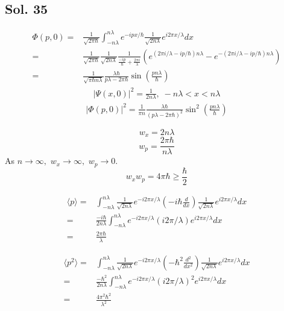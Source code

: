 \subsection*{Sol. 35}
\begin{align*}
    \Phi(p,0)=&
    \frac{1}{\sqrt{2\pi\hbar}}
    \int_{-n\lambda}^{n\lambda}
    e^{-ipx/\hbar}
    \frac{1}{\sqrt{2n\lambda}}
    e^{i2\pi x/\lambda}dx
    \\=&
     \frac{1}{\sqrt{2\pi\hbar}}
     \frac{1}{\sqrt{2n\lambda}}
     \frac{1}{\frac{-ip}{\hbar}+\frac{2\pi i}{\lambda}}
     (e^{(2\pi i/\lambda-ip/\hbar)n\lambda}-e^{-(2\pi i/\lambda-ip/\hbar)n\lambda})\\
     =&\frac{1}{\sqrt{\pi\hbar n\lambda}}\frac{\lambda\hbar}{p\lambda-2\pi \hbar}\sin\left(\frac{pn\lambda}{\hbar}\right)
\end{align*}
\begin{align*}
    |\Psi(x,0)|^2 = \frac{1}{2n\lambda}, \; -n\lambda < x<n\lambda
\end{align*}
\begin{align*}
    |\Phi(p,0)|^2 = 
    \frac{1}{\pi n}\frac{\lambda\hbar}{(p\lambda-2\pi \hbar)^2}
    \sin^2\left(\frac{pn\lambda}{\hbar}\right)
\end{align*}


$$
w_x = 2n\lambda
$$
$$
w_p = \frac{2\pi \hbar}{n\lambda}
$$
As $n\to\infty,$ $w_x\to\infty,$ $w_p\to0.$
$$
w_xw_p = 4\pi\hbar \geq \frac{\hbar}{2}
$$

\begin{align*}
    \langle p\rangle
=&\int_{-n\lambda}^{n\lambda}
\frac{1}{\sqrt{2n\lambda}}e^{-i2\pi x/\lambda}
(-i\hbar\frac{d}{dx})
\frac{1}{\sqrt{2n\lambda}}e^{i2\pi x/\lambda}dx\\
=&\frac{-i\hbar}{2n\lambda}
\int_{-n\lambda}^{n\lambda}
e^{-i2\pi x/\lambda}(i2\pi/\lambda)e^{i2\pi x/\lambda}dx\\
=&\frac{2\pi\hbar}{\lambda}
\end{align*}

\begin{align*}
    \langle p^2\rangle
=&\int_{-n\lambda}^{n\lambda}
\frac{1}{\sqrt{2n\lambda}}e^{-i2\pi x/\lambda}
(-\hbar^2\frac{d^2}{dx^2})
\frac{1}{\sqrt{2n\lambda}}e^{i2\pi x/\lambda}dx\\
=&\frac{-\hbar^2}{2n\lambda}
\int_{-n\lambda}^{n\lambda}
e^{-i2\pi x/\lambda}(i2\pi/\lambda)^2e^{i2\pi x/\lambda}dx\\
=&\frac{4\pi^2\hbar^2}{\lambda^2}
\end{align*}

